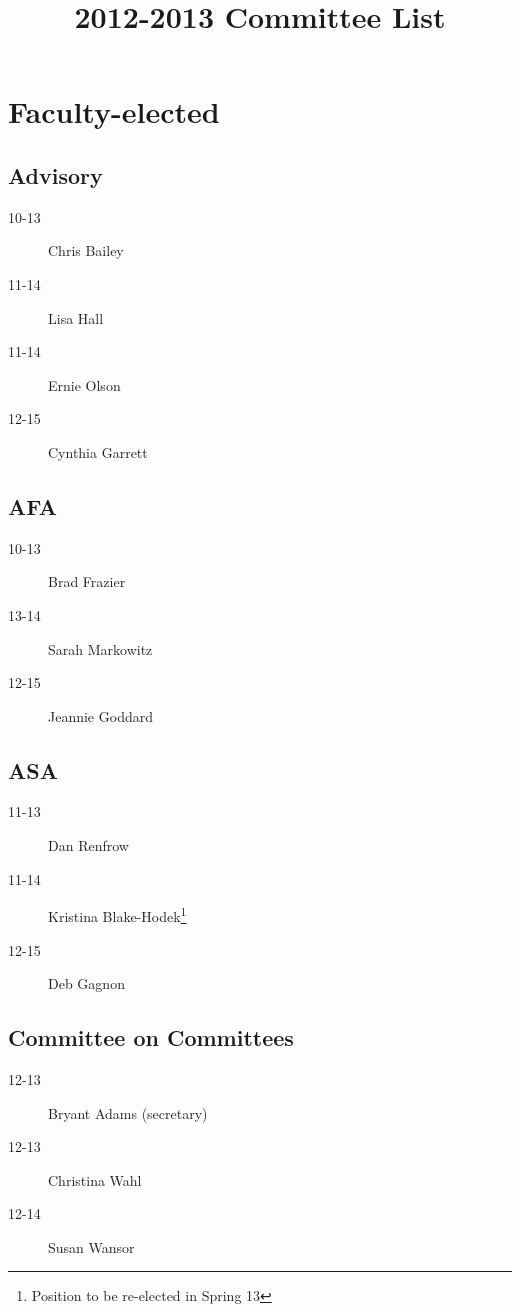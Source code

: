 \documentclass[10pt, twocolumn]{amsart}
\title{2012-2013 Committee List}
\newcommand{\noteMajor}[1]{}
\begin{document}
\maketitle

\section*{Faculty-elected}
\subsection*{Advisory}
\begin{description}
\item[10-13] Chris Bailey \noteMajor{Chemistry}
\item[11-14] Lisa Hall \noteMajor{Women's Studies}
\item[11-14] Ernie Olson \noteMajor{Anthropology and Religion}
\item[12-15] Cynthia Garrett \noteMajor{English}
\end{description}

\subsection*{AFA}
\begin{description}
\item[10-13] Brad Frazier
\item[13-14] Sarah Markowitz
\item[12-15] Jeannie Goddard
\end{description}

\subsection*{ASA}
\begin{description}
\item[11-13] Dan Renfrow
\item[11-14] Kristina Blake-Hodek\footnote{Position to be re-elected in Spring 13}
\item[12-15] Deb Gagnon
\end{description}

\subsection*{Committee on Committees}
\begin{description}
\item[12-13] Bryant Adams (secretary)
\item[12-13] Christina Wahl
\item[12-14] Susan Wansor
\end{description}
\end{document}
